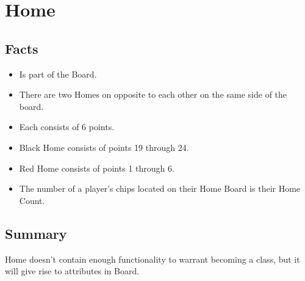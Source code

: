 \section{Home}

\subsection{Facts}

\begin{itemize} [itemsep=2pt,parsep=2pt]
    \item Is part of the Board.
    \item There are two Homes on opposite to each other on the same side of the board.
    \item Each consists of 6 points.
    \item Black Home consists of points 19 through 24.
    \item Red Home consists of points 1 through 6.
    \item The number of a player’s chips located on their Home Board is their Home Count.
\end{itemize}


\subsection{Summary}
Home doesn't contain enough functionality to warrant becoming a class, but it will give rise to attributes in Board.
